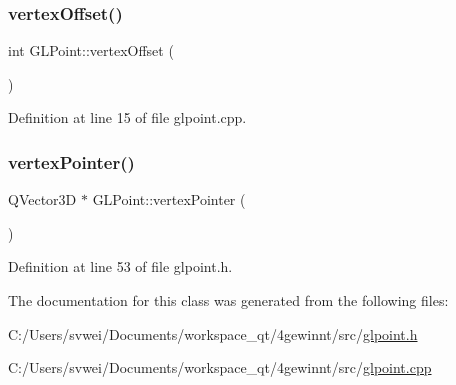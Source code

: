 \subsubsection{\texorpdfstring{vertexOffset()}{vertexOffset()}}
{\footnotesize\ttfamily int G\+L\+Point\+::vertex\+Offset (\begin{DoxyParamCaption}{ }\end{DoxyParamCaption})\hspace{0.3cm}{\ttfamily [static]}}



Definition at line 15 of file glpoint.\+cpp.

\mbox{\label{class_g_l_point_a5582523837a5fbae6aeaf7c360553c0b}} 
\subsubsection{\texorpdfstring{vertexPointer()}{vertexPointer()}}
{\footnotesize\ttfamily Q\+Vector3D $\ast$ G\+L\+Point\+::vertex\+Pointer (\begin{DoxyParamCaption}{ }\end{DoxyParamCaption})\hspace{0.3cm}{\ttfamily [inline]}}



Definition at line 53 of file glpoint.\+h.



The documentation for this class was generated from the following files\+:\begin{DoxyCompactItemize}
\item 
C\+:/\+Users/svwei/\+Documents/workspace\+\_\+qt/4gewinnt/src/\mbox{\hyperlink{glpoint_8h}{glpoint.\+h}}\item 
C\+:/\+Users/svwei/\+Documents/workspace\+\_\+qt/4gewinnt/src/\mbox{\hyperlink{glpoint_8cpp}{glpoint.\+cpp}}\end{DoxyCompactItemize}
